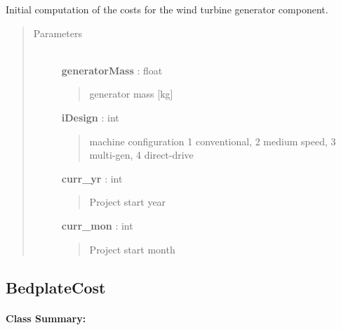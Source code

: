 \documentclass[letterpaper,10pt,openany,oneside]{sphinxmanual}
\begin{document}
\begin{fulllineitems}
\label{documentation:turbine_costSE.src.nacelle_costsSE.GeneratorCost}
Initial computation of the costs for the wind turbine generator component.
\begin{quote}\begin{description}
\item[{Parameters }] \leavevmode\\
\textbf{generatorMass} : float
\begin{quote}

generator mass {[}kg{]}
\end{quote}

\textbf{iDesign} : int
\begin{quote}

machine configuration 1 conventional, 2 medium speed, 3 multi-gen, 4 direct-drive
\end{quote}

\textbf{curr\_yr} : int
\begin{quote}

Project start year
\end{quote}

\textbf{curr\_mon} : int
\begin{quote}

Project start month
\end{quote}

\end{description}\end{quote}

\end{fulllineitems}



\subsection{BedplateCost}
\label{documentation:bedplatecost}\label{documentation:bedplatecost-class-label}\paragraph{Class Summary:}
\end{document}
